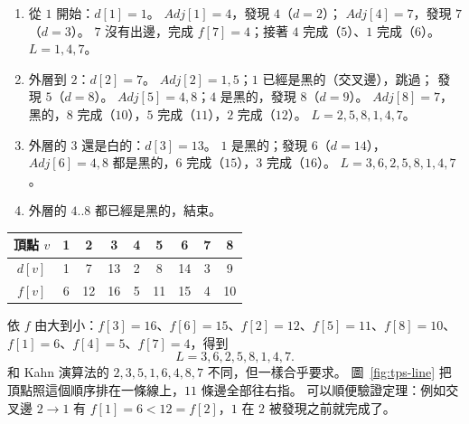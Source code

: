\begin{enumerate}
\item 從 $1$ 開始：$d[1] = 1$。 $\mathit{Adj}[1] = 4$，發現 $4$（$d = 2$）；
$\mathit{Adj}[4] = 7$，發現 $7$（$d = 3$）。 $7$ 沒有出邊，完成 $f[7] = 4$；接著 $4$
完成（$5$）、$1$ 完成（$6$）。 $L = 1, 4, 7$。
\item 外層到 $2$：$d[2] = 7$。 $\mathit{Adj}[2] = 1, 5$；$1$ 已經是黑的（交叉邊），跳過；
發現 $5$（$d = 8$）。 $\mathit{Adj}[5] = 4, 8$；$4$ 是黑的，發現 $8$（$d = 9$）。
$\mathit{Adj}[8] = 7$，黑的，$8$ 完成（$10$），$5$ 完成（$11$），$2$ 完成（$12$）。
$L = 2, 5, 8, 1, 4, 7$。
\item 外層的 $3$ 還是白的：$d[3] = 13$。 $1$ 是黑的；發現 $6$（$d = 14$），$\mathit{Adj}[6]
= 4, 8$ 都是黑的，$6$ 完成（$15$），$3$ 完成（$16$）。 $L = 3, 6, 2, 5, 8, 1, 4, 7$。
\item 外層的 $4..8$ 都已經是黑的，結束。
\end{enumerate}

\begin{center}
\begin{tabular}{c*{8}{c}}
\toprule
頂點 $v$ & 1 & 2 & 3 & 4 & 5 & 6 & 7 & 8 \\
\midrule
$d[v]$ & 1 & 7 & 13 & 2 & 8 & 14 & 3 & 9 \\
$f[v]$ & 6 & 12 & 16 & 5 & 11 & 15 & 4 & 10 \\
\bottomrule
\end{tabular}
\end{center}

依 $f$ 由大到小：$f[3] = 16$、$f[6] = 15$、$f[2] = 12$、$f[5] = 11$、$f[8] = 10$、
$f[1] = 6$、$f[4] = 5$、$f[7] = 4$，得到
\[
L = 3, 6, 2, 5, 8, 1, 4, 7.
\]
和 Kahn 演算法的 $2, 3, 5, 1, 6, 4, 8, 7$ 不同，但一樣合乎要求。 圖~\ref{fig:tps-line}
把頂點照這個順序排在一條線上，$11$ 條邊全部往右指。 可以順便驗證定理：例如交叉邊
$2 \to 1$ 有 $f[1] = 6 < 12 = f[2]$，$1$ 在 $2$ 被發現之前就完成了。

\begin{center}
\label{fig:tps-line}
\end{center}

